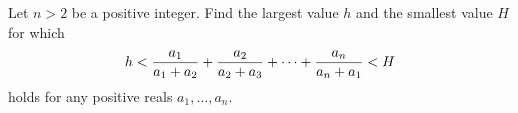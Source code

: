 Let $n>2$ be a positive integer. Find the largest value $h$ and the smallest value $H$ for which
\[h<{a_1\over a_1+a_2}+{a_2\over a_2+a_3}+\cdots+{a_n\over a_n+a_1}<H\]
holds for any positive reals $a_1,\dots,a_n$.
